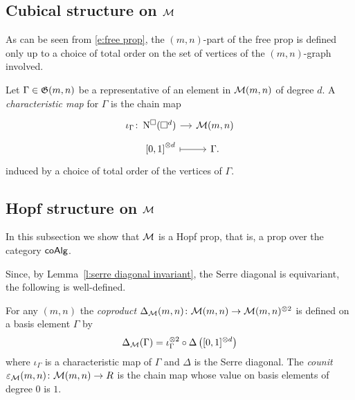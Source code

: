 
\subsection{Cubical structure on $\mathcal{M}$}

As can be seen from \eqref{e:free prop}, the $(m,n)$-part of the free prop is defined only up to a choice of total order on the set of vertices of the $(m,n)$-graph involved.

\begin{definition}
	Let $\Gamma \in \mathfrak{G}(m,n)$ be a representative of an element in $\mathcal{M}(m,n)$ of degree $d$. A \textit{characteristic map} for $\Gamma$ is the chain map \vspace*{-5pt}
	\begin{equation} \label{e:order chain map}
	\begin{tikzcd}[row sep=tiny, column sep=small]
	\iota_\Gamma \colon \cchains(\square^d) \arrow[r] & \M(m,n) \\
	\qquad {[0,1]}^{\otimes d} \arrow[r, |->] & \Gamma.
	\end{tikzcd}
	\end{equation}
	induced by a choice of total order of the vertices of $\Gamma$.
\end{definition}


\subsection{Hopf structure on $\mathcal{M}$}

In this subsection we show that $\mathcal{M}$ is a Hopf prop, that is, a prop over the category $\mathsf{coAlg}$.

Since, by Lemma~\ref{l:serre diagonal invariant}, the Serre diagonal is equivariant, the following is well-defined.
\begin{definition}
	For any $(m,n)$ the \textit{coproduct} $\Delta_{\mathcal{M}}(m,n) \colon \mathcal{M}(m,n) \to \mathcal{M}(m,n)^{\otimes 2}$ is defined on a basis element $\Gamma$ by
	\begin{equation} \label{e:diagonal of M}
	\Delta_{\mathcal{M}}(\Gamma) = \iota_\Gamma^{\otimes 2} \circ \Delta \left([0,1]^{\otimes d}\right)
	\end{equation}
	where $\iota_\Gamma$ is a characteristic map of $\Gamma$ and $\Delta$ is the Serre diagonal.
	The \textit{counit} $\varepsilon_{\mathcal{M}}(m,n) \colon \mathcal{M}(m,n) \to R$ is the chain map whose value on basis elements of degree $0$ is $1$. 
\end{definition}

